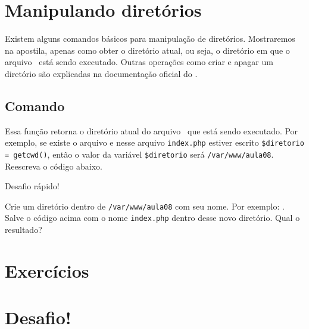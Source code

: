 \section{Manipulando diretórios}
\label{manipulando-diretorios}

Existem alguns comandos básicos para manipulação de diretórios. Mostraremos
na apostila, apenas como obter o diretório atual, ou seja, o diretório em que o
arquivo \phpextensao~está sendo executado. Outras operações como criar e apagar
um diretório são explicadas na documentação oficial do \php.

\subsection{Comando \funcaogetcwd}
\label{comando-getcwd}

Essa função retorna o diretório atual do arquivo \php~que está sendo executado.
Por exemplo, se existe o arquivo  e nesse
arquivo \texttt{index.php} estiver escrito \texttt{\$diretorio = getcwd()},
então o valor da variável \texttt{\$diretorio} será \texttt{/var/www/aula08}.
Reescreva o código abaixo.



\begin{framed}
{\Large Desafio rápido!}

Crie um diretório dentro de \texttt{/var/www/aula08} com seu nome. Por exemplo:
. Salve o código acima com o nome \texttt{index.php}
dentro desse novo diretório. Qual o resultado?
\end{framed}

\section{Exercícios}
\label{cap9-exercicios}

\section{Desafio!}
\label{cap9-desafio}